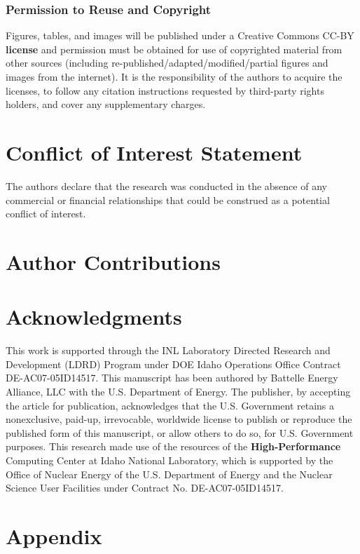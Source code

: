 \documentclass[utf8]{frontiersSCNS} %
\providecommand{\DIFaddtex}[1]{{\bf #1}} %
\providecommand{\DIFdeltex}[1]{} %
\providecommand{\DIFaddbegin}{\protect\color{blue}} %
\providecommand{\DIFaddend}{\protect\color{black}} %
\providecommand{\DIFdelbegin}{\protect\color{red}} %
\providecommand{\DIFdelend}{\protect\color{black}} %
\providecommand{\DIFadd}[1]{\texorpdfstring{\DIFaddtex{#1}}{#1}} %
\providecommand{\DIFdel}[1]{\texorpdfstring{\DIFdeltex{#1}}{}} %
\begin{document}
\subsubsection{Permission to Reuse and Copyright}
Figures, tables, and images will be published under a Creative Commons CC-BY \DIFdelbegin \DIFdel{licence }\DIFdelend \DIFaddbegin \DIFadd{license }\DIFaddend and permission must be obtained for use of copyrighted material from other sources (including re-published/adapted/modified/partial figures and images from the internet). It is the responsibility of the authors to acquire the licenses, to follow any citation instructions requested by third-party rights holders, and cover any supplementary charges.

\section*{Conflict of Interest Statement}

The authors declare that the research was conducted in the absence of any commercial or financial relationships that could be construed as a potential conflict of interest.

\section*{Author Contributions}


\section*{Acknowledgments}
This work is supported through the INL Laboratory Directed Research and Development (LDRD) Program under DOE Idaho Operations Office Contract DE-AC07-05ID14517. This manuscript has been authored by Battelle Energy Alliance, LLC with the U.S. Department of Energy. The publisher, by accepting the article for publication, acknowledges that the U.S. Government retains a nonexclusive, paid-up, irrevocable, worldwide license to publish or reproduce the published form of this manuscript, or allow others to do so, for U.S. Government purposes. This research made use of the resources of the \DIFdelbegin \DIFdel{High Performance }\DIFdelend \DIFaddbegin \DIFadd{High-Performance }\DIFaddend Computing Center at Idaho National Laboratory, which is supported by the Office of Nuclear Energy of the U.S. Department of Energy and the Nuclear Science User Facilities under Contract No. DE-AC07-05ID14517. 

\section{Appendix}
\end{document}
